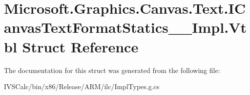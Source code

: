 \hypertarget{struct_microsoft_1_1_graphics_1_1_canvas_1_1_text_1_1_i_canvas_text_format_statics_____impl_1_1_vtbl}{}\section{Microsoft.\+Graphics.\+Canvas.\+Text.\+I\+Canvas\+Text\+Format\+Statics\+\_\+\+\_\+\+Impl.\+Vtbl Struct Reference}
\label{struct_microsoft_1_1_graphics_1_1_canvas_1_1_text_1_1_i_canvas_text_format_statics_____impl_1_1_vtbl}


The documentation for this struct was generated from the following file\+:\begin{DoxyCompactItemize}
\item 
I\+V\+S\+Calc/bin/x86/\+Release/\+A\+R\+M/ilc/Impl\+Types.\+g.\+cs\end{DoxyCompactItemize}

